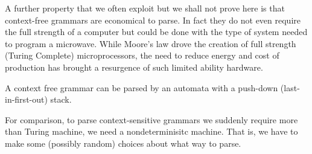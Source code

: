 A further property that we often exploit but we shall not prove here is that 
context-free grammars are economical to parse.  In fact they do not even 
require the full strength of a computer but could be done with the type 
of system needed to program a microwave.  While Moore's law drove the creation 
of full strength (Turing Complete) microprocessors, the need to reduce energy 
and cost of production has brought a resurgence of such limited ability 
hardware.  
\begin{proposition}
    A context free grammar can be parsed by an automata with a push-down (last-in-first-out)
    stack.
\end{proposition}

For comparison, to parse context-sensitive grammars we suddenly require more 
than Turing machine, we need a nondeterminisitc machine.  That is, we have to make 
some (possibly random) choices about what way to parse.





    

